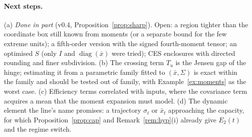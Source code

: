 \documentclass[10pt,a4paper]{article}
\theoremstyle{plain}
\theoremstyle{definition}
\theoremstyle{remark}
\newcommand{\Tu}{T_u}
\begin{document}
\paragraph{Next steps.} (a) \emph{Done in part} (v0.4, Proposition~\ref{prop:sharp}). Open: a region tighter than the coordinate box still known from moments (or a separate bound for the few extreme units); a fifth-order version with the signed fourth-moment tensor; an optimised $S$ (only $I$ and $\operatorname{diag}(\bar x)$ were tried); CES enclosures with directed rounding and finer subdivision. (b) The crossing term $\Tu$ is the Jensen gap of the hinge; estimating it from a parametric family fitted to $(\bar x,\Sigma)$ is exact within the family and should be tested out of family, with Example~\ref{ex:moments} as the worst case. (c) Efficiency terms correlated with inputs, where the covariance term acquires a mean that the moment expansion must model. (d) The dynamic element the line's name promises: a trajectory $\sigma_t$ or $\bar x_t$ approaching the capacity, for which Proposition~\ref{prop:cap} and Remark~\ref{rem:hyp}(i) already give $E_2(t)$ and the regime switch.

\appendix
\end{document}
